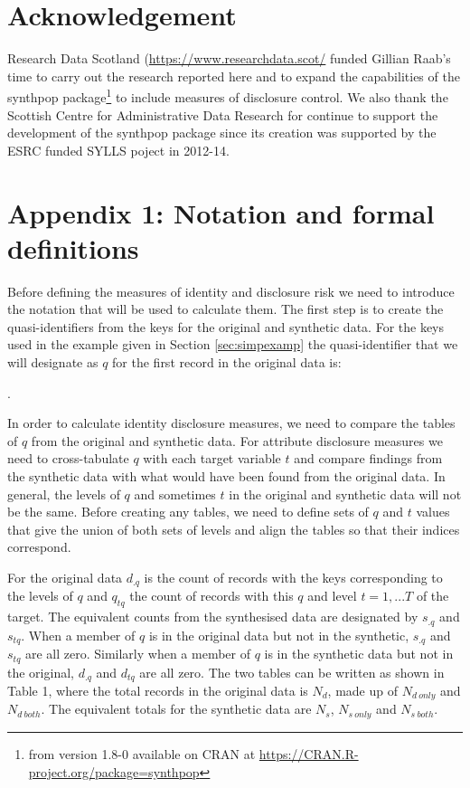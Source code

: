 \documentclass[12pt]{article}
\begin{document}
\section{Acknowledgement}
Research Data Scotland (\url{https://www.researchdata.scot/} funded Gillian Raab's time to carry 
out the research reported here and  to expand the capabilities of the synthpop package\footnote{
from version 1.8-0 available on CRAN at \url{https://CRAN.R-project.org/package=synthpop}
}
to include measures of disclosure control. We also thank the Scottish Centre for Administrative 
Data Research for continue to support the development of the synthpop package since its creation was
supported by the ESRC funded SYLLS poject in 2012-14.




\section*{Appendix 1: Notation and formal definitions}{\label{sec:app1}}
Before defining the measures of identity and disclosure risk we need to introduce the notation that will be used to calculate them. The first step is to create the quasi-identifiers from the keys for the original and synthetic data. For the keys used in the example given in Section \ref{sec:simpexamp} the quasi-identifier that we will designate as $q$ for the first record in the original data is:



.

In order to calculate identity disclosure measures, we need to compare the tables of $q$ from the original and synthetic data. For attribute disclosure measures we need to cross-tabulate $q$ with each target variable $t$ and compare findings from the synthetic data with what would have been found from the original data. In general, the levels of $q$ and sometimes $t$ in the original and synthetic data will not be the same. Before creating any tables, we need to define sets of $q$ and $t$ values that give the union of both sets of levels and align the tables so that their indices correspond.

For the original data $d_{.q}$ is the count of records with the keys corresponding to the levels of $q$ and $q_{tq}$ the count of records with this $q$ and level $t=1,...T$ of the target. The equivalent counts from the synthesised data are designated by $s_{.q}$ and $s_{tq}$. When a member of $q$ is in the original data but not in the synthetic, $s_{.q}$ and $s_{tq}$ are all zero. Similarly when a member of $q$ is in the synthetic data but not in the original, $d_{.q}$ and $d_{tq}$ are all zero. The two tables can be written as shown in Table 1, where the total records in the original data is $N_d$, made up of $N_{d~only}$ and $N_{d~both}$. The
equivalent totals for the synthetic data are $N_s$, $N_{s~only}$ and $N_{s~both}$.
\end{document}
